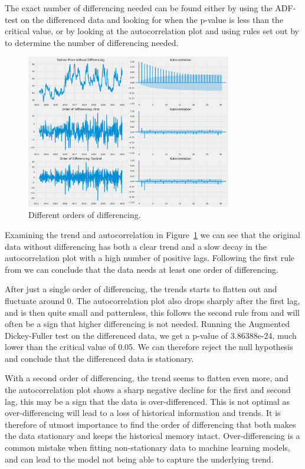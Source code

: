 The exact number of differencing needed can be found either by using the ADF-test on the differenced data and looking for when the p-value is less than the critical value, or by looking at the autocorrelation plot and using rules set out by \textcite{nau_2019} to determine the number of differencing needed. 
\begin{figure}[H]
    \centering
    \includegraphics[width=0.8\textwidth]{data/Figures/ARIMA/Diff1_ACF_30.png}
    \caption[Different orders of differencing]{Different orders of differencing.}\label{fig:ACF_Differencing}
\end{figure}
Examining the trend and autocorrelation in Figure~\ref{fig:ACF_Differencing} we can see that the original data without differencing has both a clear trend and a slow decay in the autocorrelation plot with a high number of positive lags. Following the first rule from \textcite{nau_2019} we can conclude that the data needs at least one order of differencing.

After just a single order of differencing, the trends starts to flatten out and fluctuate around 0. The autocorrelation plot also drops sharply after the first lag, and is then quite small and patternless, this follows the second rule from \textcite{nau_2019} and will often be a sign that higher differencing is not needed. Running the Augmented Dickey-Fuller test on the differenced data, we get a p-value of 3.86388e-24, much lower than the critical value of 0.05. We can therefore reject the null hypothesis and conclude that the differenced data is stationary. 

With a second order of differencing, the trend seems to flatten even more, and the autocorrelation plot shows a sharp negative decline for the first and second lag, this may be a sign that the data is over-differenced. This is not optimal as over-differencing will lead to a loss of historical information and trends. It is therefore of utmost importance to find the order of differencing that both makes the data stationary and keeps the historical memory intact. Over-differencing is a common mistake when fitting non-stationary data to machine learning models, and can lead to the model not being able to capture the underlying trend.~\parencite{lopezde_prado2018}

